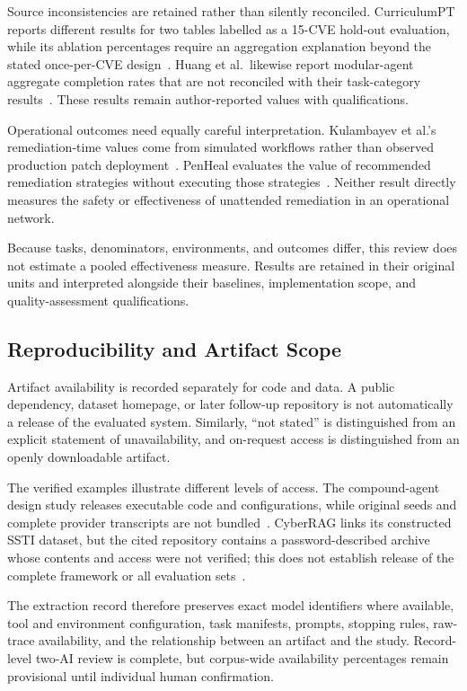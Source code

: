 Source inconsistencies are retained rather than silently reconciled. CurriculumPT reports different results for two tables labelled as a 15-CVE hold-out evaluation, while its ablation percentages require an aggregation explanation beyond the stated once-per-CVE design~\cite{R0322_Wu_2025}. Huang et al.\ likewise report modular-agent aggregate completion rates that are not reconciled with their task-category results~\cite{R0320_Huang_2025}. These results remain author-reported values with qualifications.

Operational outcomes need equally careful interpretation. Kulambayev et al.'s remediation-time values come from simulated workflows rather than observed production patch deployment~\cite{R0311_Kulambayev_2026}. PenHeal evaluates the value of recommended remediation strategies without executing those strategies~\cite{R0315_Huang_2024}. Neither result directly measures the safety or effectiveness of unattended remediation in an operational network.

Because tasks, denominators, environments, and outcomes differ, this review does not estimate a pooled effectiveness measure. Results are retained in their original units and interpreted alongside their baselines, implementation scope, and quality-assessment qualifications.

\subsection{Reproducibility and Artifact Scope}

Artifact availability is recorded separately for code and data. A public dependency, dataset homepage, or later follow-up repository is not automatically a release of the evaluated system. Similarly, ``not stated'' is distinguished from an explicit statement of unavailability, and on-request access is distinguished from an openly downloadable artifact.

The verified examples illustrate different levels of access. The compound-agent design study releases executable code and configurations, while original seeds and complete provider transcripts are not bundled~\cite{R0484_Bogdanov_2026}. CyberRAG links its constructed SSTI dataset, but the cited repository contains a password-described archive whose contents and access were not verified; this does not establish release of the complete framework or all evaluation sets~\cite{R0447_Blefari_2026}.

The extraction record therefore preserves exact model identifiers where available, tool and environment configuration, task manifests, prompts, stopping rules, raw-trace availability, and the relationship between an artifact and the study. Record-level two-AI review is complete, but corpus-wide availability percentages remain provisional until individual human confirmation.
